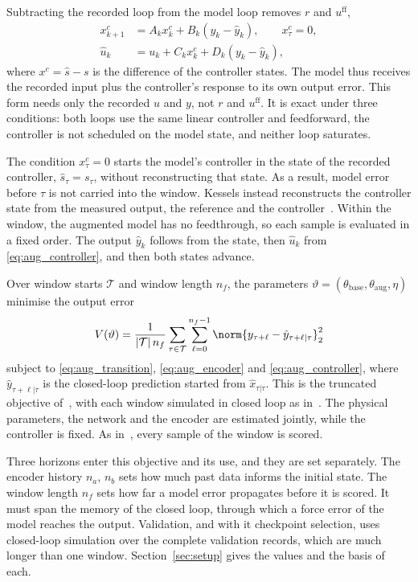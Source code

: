 Subtracting the recorded loop from the model loop removes $r$ and
$u^{\mathrm{ff}}$,
\begin{equation}
\begin{aligned}
 x^c_{k+1}&=A_k x^c_k+B_k(y_k-\hat y_k),\qquad x^c_\tau=0,\\
 \hat u_k&=u_k+C_k x^c_k+D_k(y_k-\hat y_k),
\end{aligned}
\label{eq:aug_controller}
\end{equation}
where $x^c=\hat s-s$ is the difference of the controller states.
The model thus receives the recorded input plus the controller's response to
its own output error.
This form needs only the recorded $u$ and $y$, not $r$ and
$u^{\mathrm{ff}}$.
It is exact under three conditions: both loops use the same linear
controller and feedforward, the controller is not scheduled on the model
state, and neither loop saturates.

The condition $x^c_\tau=0$ starts the model's controller in the state of the
recorded controller, $\hat s_\tau=s_\tau$, without reconstructing that
state.
As a result, model error before $\tau$ is not carried into the window.
Kessels instead reconstructs the controller state from the measured output,
the reference and the controller~\cite[Remark~5.4]{kessels2025ai}.
Within the window, the augmented model has no feedthrough, so each sample is
evaluated in a fixed order.
The output $\hat y_k$ follows from the state, then $\hat u_k$ from
\eqref{eq:aug_controller}, and then both states advance.

Over window starts $\mathcal T$ and window length $n_f$, the parameters
$\vartheta=(\theta_{\mathrm{base}},\theta_{\mathrm{aug}},\eta)$ minimise the
output error
\begin{equation}
 V(\vartheta)=\frac{1}{|\mathcal T|\,n_f}
 \sum_{\tau\in\mathcal T}\sum_{\ell=0}^{n_f-1}
 \norm{y_{\tau+\ell}-\hat y_{\tau+\ell|\tau}}_2^2
 \label{eq:aug_loss}
\end{equation}
subject to \eqref{eq:aug_transition}, \eqref{eq:aug_encoder} and
\eqref{eq:aug_controller}, where $\hat y_{\tau+\ell|\tau}$ is the
closed-loop prediction started from $\hat x_{\tau|\tau}$.
This is the truncated objective of~\cite[Eq.~(22)]{hoekstra2026lfr}, with
each window simulated in closed loop as in~\cite[Eq.~(5.12)]{kessels2025ai}.
The physical parameters, the network and the encoder are estimated jointly,
while the controller is fixed.
As in~\cite[Eq.~(22)]{hoekstra2026lfr}, every sample of the window is
scored.

Three horizons enter this objective and its use, and they are set
separately.
The encoder history $n_a$, $n_b$ sets how much past data informs the initial
state.
The window length $n_f$ sets how far a model error propagates before it is
scored.
It must span the memory of the closed loop, through which a force error of
the model reaches the output.
Validation, and with it checkpoint selection, uses closed-loop simulation
over the complete validation records, which are much longer than one window.
Section~\ref{sec:setup} gives the values and the basis of each.

